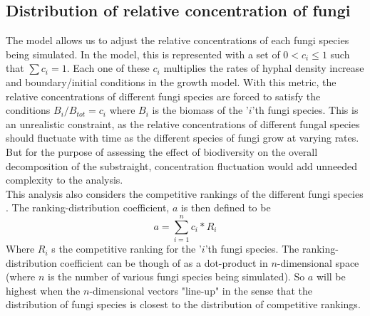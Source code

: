 \documentclass[12pt]{article}
\begin{document}
\begin{multicols}{2}
\subsection{Distribution of relative concentration of fungi}
The model allows us to adjust the relative concentrations of each fungi species being simulated. In the model, this is represented with a set of $0<c_{i}\leq 1$ such that $\sum c_{i} = 1$. Each one of these $c_{i}$ multiplies the rates of hyphal density increase and boundary/initial conditions in the growth model. With this metric, the relative concentrations of different fungi species are forced to satisfy the conditions $B_{i}/B_{tot}=c_{i}$ where $B_{i}$ is the biomass of the '$i$'th fungi species. This is an unrealistic constraint, as the relative concentrations of different fungal species should fluctuate with time as the different species of fungi grow at varying rates. But for the purpose of assessing the effect of biodiversity on the overall decomposition of the substraight, concentration fluctuation would add unneeded complexity to the analysis. \\
This analysis also considers the competitive rankings of the different fungi species \cite{Maynard2019}. The ranking-distribution coefficient, $a$ is then defined to be
\begin{equation} \label{eq}
a = \sum_{i=1}^{n} c_{i}*R_{i}
\end{equation}
Where $R_{i}$ s the competitive ranking for the '$i$'th fungi species. The ranking-distribution coefficient can be though of as a dot-product in $n$-dimensional space (where $n$ is the number of various fungi species being simulated). So $a$ will be highest when the $n$-dimensional vectors "line-up" in the sense that the distribution of fungi species is closest to the distribution of competitive rankings.\\

\end{multicols}
\end{document}

